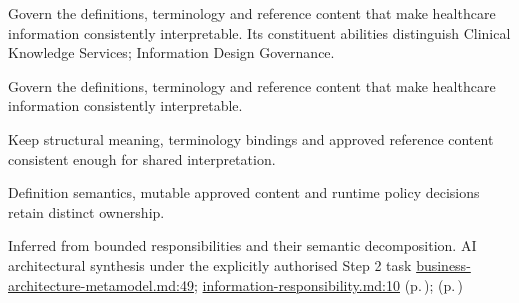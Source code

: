 Govern the definitions, terminology and reference content that make healthcare information consistently interpretable. Its constituent abilities distinguish Clinical Knowledge Services; Information Design Governance.



Govern the definitions, terminology and reference content that make healthcare information consistently interpretable.



Keep structural meaning, terminology bindings and approved reference content consistent enough for shared interpretation.



Definition semantics, mutable approved content and runtime policy decisions retain distinct ownership.


Inferred from bounded responsibilities and their semantic decomposition. AI architectural synthesis under the explicitly authorised Step 2 task \hyperref[evidence:4bac85accd34ce0b]{business-architecture-metamodel.md:49}; \hyperref[evidence:be61392fefb4bb10]{information-responsibility.md:10}
 (p.\,\pageref{cap:bec-clinical-knowledge-services});  (p.\,\pageref{cap:bec-information-design-governance})
